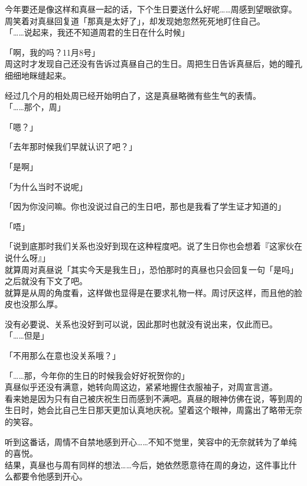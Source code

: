 今年要还是像这样和真昼一起的话，下个生日要送什么好呢……周感到望眼欲穿。\\

周笑着对真昼回复道「那真是太好了」，却发现她忽然死死地盯住自己。\\

「……说起来，我还不知道周君的生日在什么时候」

「啊，我的吗？11月8号」\\

周这时才发现自己还没有告诉过真昼自己的生日。周把生日告诉真昼后，她的瞳孔细细地眯缝起来。

经过几个月的相处周已经开始明白了，这是真昼略微有些生气的表情。\\

「……那个，周」

「嗯？」

「去年那时候我们早就认识了吧？」

「是啊」

「为什么当时不说呢」

「因为你没问嘛。你也没说过自己的生日吧，那也是我看了学生证才知道的」

「唔」

「说到底那时我们关系也没好到现在这种程度吧。说了生日你也会想着『这家伙在说什么呀』」\\

就算周对真昼说「其实今天是我生日」，恐怕那时的真昼也只会回复一句「是吗」之后就没有下文了吧。\\

就算是从周的角度看，这样做也显得是在要求礼物一样。周讨厌这样，而且他的脸皮也没那么厚。

没有必要说、关系也没好到可以说，因此那时也就没有说出来，仅此而已。\\

「……但是」

「不用那么在意也没关系哦？」

「……那，今年你的生日的时候我会好好祝贺你的」\\

真昼似乎还没有满意，她转向周这边，紧紧地握住衣服袖子，对周宣言道。\\

看来她是因为只有自己被庆祝生日而感到不满吧。真昼的眼神仿佛在说，等到周的生日时，她会比自己生日那天更加认真地庆祝。望着这个眼神，周露出了略带无奈的笑容。

听到这番话，周情不自禁地感到开心……不知不觉里，笑容中的无奈就转为了单纯的喜悦。\\

结果，真昼也与周有同样的想法……今后，她依然愿意待在周的身边，这件事比什么都要令他感到开心。\\

